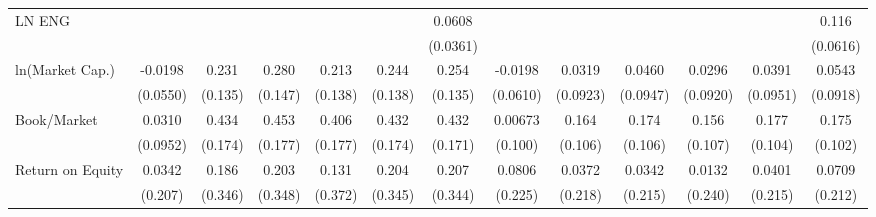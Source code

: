 {\begin{tabular}{l*{12}{c}}
LN ENG              &                     &                     &                     &                     &                     &      0.0608\sym{*}  &                     &                     &                     &                     &                     &       0.116\sym{*}  \\
                    &                     &                     &                     &                     &                     &    (0.0361)         &                     &                     &                     &                     &                     &    (0.0616)         \\
ln(Market Cap.)     &     -0.0198         &       0.231\sym{*}  &       0.280\sym{*}  &       0.213         &       0.244\sym{*}  &       0.254\sym{*}  &     -0.0198         &      0.0319         &      0.0460         &      0.0296         &      0.0391         &      0.0543         \\
                    &    (0.0550)         &     (0.135)         &     (0.147)         &     (0.138)         &     (0.138)         &     (0.135)         &    (0.0610)         &    (0.0923)         &    (0.0947)         &    (0.0920)         &    (0.0951)         &    (0.0918)         \\
Book/Market         &      0.0310         &       0.434\sym{**} &       0.453\sym{**} &       0.406\sym{**} &       0.432\sym{**} &       0.432\sym{**} &     0.00673         &       0.164         &       0.174         &       0.156         &       0.177\sym{*}  &       0.175\sym{*}  \\
                    &    (0.0952)         &     (0.174)         &     (0.177)         &     (0.177)         &     (0.174)         &     (0.171)         &     (0.100)         &     (0.106)         &     (0.106)         &     (0.107)         &     (0.104)         &     (0.102)         \\
Return on Equity    &      0.0342         &       0.186         &       0.203         &       0.131         &       0.204         &       0.207         &      0.0806         &      0.0372         &      0.0342         &      0.0132         &      0.0401         &      0.0709         \\
                    &     (0.207)         &     (0.346)         &     (0.348)         &     (0.372)         &     (0.345)         &     (0.344)         &     (0.225)         &     (0.218)         &     (0.215)         &     (0.240)         &     (0.215)         &     (0.212)         \\

\end{tabular}}
